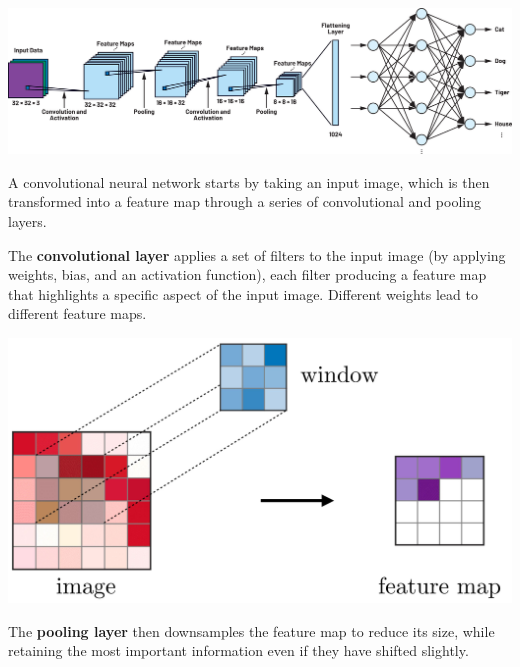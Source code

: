 \documentclass[letterpaper, 10.5pt,landscape]{article}
\begin{document}
\begin{multicols*}{3}
\begin{center}
    \begin{minipage}{\linewidth}
    \includegraphics[width=\textwidth]{figures/cnn_architecture.png}
    \end{minipage}
\end{center}

\vspace{-5pt}

A convolutional neural network starts by taking an input image, which is then transformed into a feature map through a series of convolutional and pooling layers. 

\vspace{2pt}
The \textbf{convolutional layer} applies a set of filters to the input image (by applying weights, bias, and an activation function), each filter producing a feature map that highlights a specific aspect of the input image. Different weights lead to different feature maps.
\vspace{-5pt}
\begin{center}
    \includegraphics[scale = .09]{figures/windowCNNNew.JPG}
\end{center}
\vspace{-2mm}



The \textbf{pooling layer} then downsamples the feature map to reduce its size, while retaining the most important information even if they have shifted slightly. 


\end{multicols*}
\end{document}
